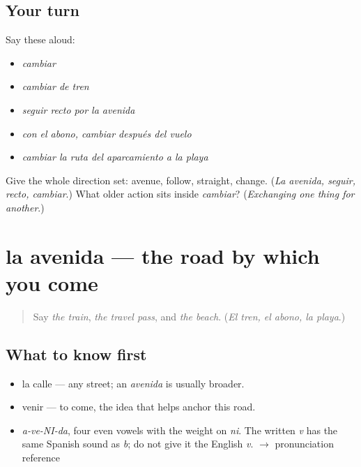 \subsection*{Your turn}
Say these aloud:

\begin{itemize}
\raggedright
  \item \emph{cambiar}
  \item \emph{cambiar de tren}
  \item \emph{seguir recto por la avenida}
  \item \emph{con el abono, cambiar después del vuelo}
  \item \emph{cambiar la ruta del aparcamiento a la playa}
\end{itemize}

\begin{tcolorbox}[breakable,colback=teal!4,colframe=teal!35!black,title={Before you move on}]
Give the whole direction set: avenue, follow, straight, change. (\emph{La avenida, seguir, recto, cambiar}.) What older action sits inside \emph{cambiar}? (\emph{Exchanging one thing for another}.)
\end{tcolorbox}
\section[la avenida]{la avenida — the road by which you come}

\label{lesson:ES-C401-avenida}



\begin{quote}
Say \emph{the train}, \emph{the travel pass}, and \emph{the beach}. (\emph{El tren, el abono, la playa}.)
\end{quote}

\subsection*{What to know first}
\begin{itemize}
\raggedright
  \item la calle — any street; an \emph{avenida} is usually broader.
  \item venir — to come, the idea that helps anchor this road.
\end{itemize}

\begin{sounds}
\begin{itemize}
\raggedright
  \item \emph{a-ve-NI-da}, four even vowels with the weight on \emph{ni}. The written \emph{v} has the same Spanish sound as \emph{b}; do not give it the English \emph{v}. $\to$ pronunciation reference
\end{itemize}
\end{sounds}

